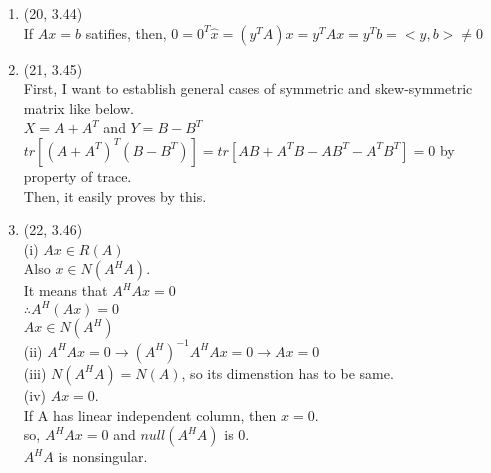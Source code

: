 \documentclass[letterpaper,12pt]{article}
\theoremstyle{definition}
\begin{document}
\begin{enumerate}
				(ii) $ <A_{2},A_{3}A_{1}> = <A_{2}A_{1}^{*}, A_{3}> \\
					tr(A_{2}^{H}A_{3}A_{1}) = tr((A_{2}A_{1}^{*})^HA_{3})$ ?? \\
					$\rightarrow tr(A_{1}^{H}A_{2}A_{3}^H) = tr((A_{2}A_{1}^{*})^HA_{3})$


				(iii) $T_{A}(X) = AX -XA  \\
					<X, T_{A^*}X> =tr[X^*(A^*X-XA^*)] \\
					 =tr[X^*XA-AXX^*]\\
					 =tr[X^*(XA-AX)]\\
					 = tr[(XA-AX)^*X]\\
					 = <T_{A}(X), X>\\
					 = <X, (T_{A})^*(X)> \\$
				$\therefore (T_{A})^*=T_{A^*}$




	\item (20, 3.44) \\ If $Ax=b$ satifies, then, $0=0^T\hat{x}=(y^TA)x=y^TAx=y^Tb=<y, b> \neq 0 $



	\item (21, 3.45) \\First, I want to establish general cases of symmetric and skew-symmetric matrix like below.\\ $ X=A+A^T$ and $ Y=B-B^T$ \\
			$ tr[(A+A^T)^T(B-B^T)] = tr[AB+A^TB-AB^T-A^TB^T] = 0 $ by property of trace.\\
			Then, it easily proves by this.



	\item (22, 3.46) \\
		(i) $Ax\in R(A) $\\ Also $x \in N(A^HA).$ \\ It means that $A^HAx=0$\\
		$\therefore A^H(Ax)=0$\\
		$Ax \in N(A^H)$ \\
		(ii) $A^HAx=0 \rightarrow (A^H)^{-1}A^HAx=0 \rightarrow Ax=0$ \\
		(iii) $N(A^HA) = N(A)$, so its dimenstion has to be same. \\
		(iv) $Ax=0$. \\ If A has linear independent column, then $x = 0$.\\	
			so, $A^HAx=0$ and $null(A^HA)$ is ${0}$. \\ $A^HA$ is nonsingular.




\end{enumerate}
\end{document}
